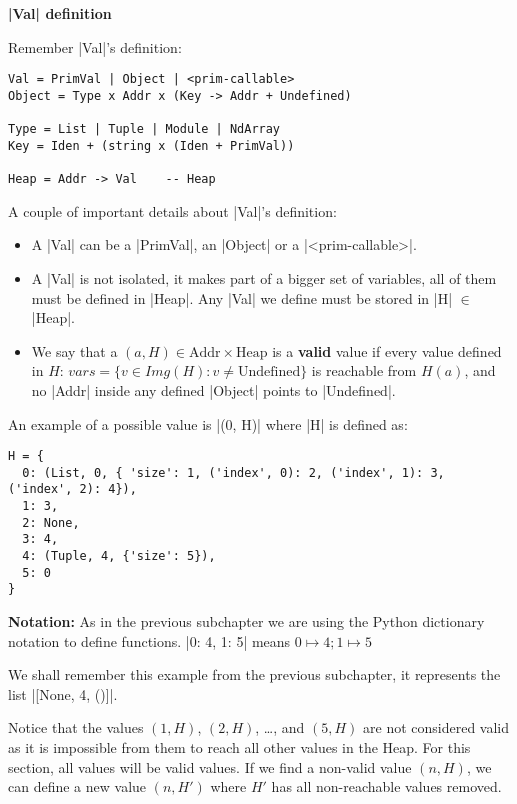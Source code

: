\noindent \textbf{\pycode|Val| definition}

Remember \pycode|Val|'s definition:

\begin{verbatim}
Val = PrimVal | Object | <prim-callable>
Object = Type x Addr x (Key -> Addr + Undefined)

Type = List | Tuple | Module | NdArray
Key = Iden + (string x (Iden + PrimVal))

Heap = Addr -> Val    -- Heap
\end{verbatim}

A couple of important details about \pycode|Val|'s definition:

\begin{itemize}
\tightlist
\item
  A \pycode|Val| can be a \pycode|PrimVal|, an \pycode|Object| or a
  \pycode|<prim-callable>|.
\item
  A \pycode|Val| is not isolated, it makes part of a bigger set of
  variables, all of them must be defined in \pycode|Heap|. Any
  \pycode|Val| we define must be stored in \pycode|H| \(\in\)
  \pycode|Heap|.
\item
  We say that a \((a, H) \in \text{Addr} \times \text{Heap}\) is a
  \textbf{valid} value if every value defined in \(H\):
  \(vars = \{v \in Img(H) : v \ne \text{Undefined}\}\) is reachable from
  \(H(a)\), and no \pycode|Addr| inside any defined \pycode|Object|
  points to \pycode|Undefined|.
\end{itemize}

An example of a possible value is \pycode|(0, H)| where \pycode|H| is
defined as:

\begin{verbatim}
H = {
  0: (List, 0, { 'size': 1, ('index', 0): 2, ('index', 1): 3, ('index', 2): 4}),
  1: 3,
  2: None,
  3: 4,
  4: (Tuple, 4, {'size': 5}),
  5: 0
}
\end{verbatim}

\textbf{Notation:} As in the previous subchapter we are using the Python
dictionary notation to define functions. \pycode|{0: 4, 1: 5}|
means \(0 \mapsto 4; 1 \mapsto 5\)

We shall remember this example from the previous subchapter, it
represents the list \pycode|[None, 4, ()]|.

Notice that the values \((1, H)\), \((2, H)\), \ldots{}, and \((5, H)\)
are not considered valid as it is impossible from them to reach all
other values in the Heap. For this section, all values will be valid
values. If we find a non-valid value \((n, H)\), we can define a new
value \((n, H')\) where \(H'\) has all non-reachable values removed.

